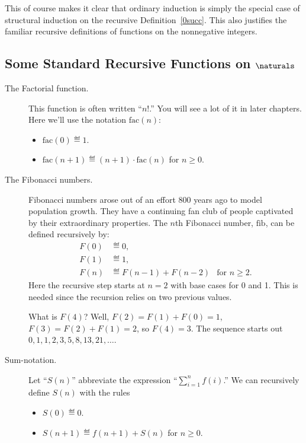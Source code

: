 This of course makes it clear that ordinary induction is simply the
special case of structural induction on the recursive
Definition~\ref{0succ}.  This also justifies the familiar recursive
definitions of functions on the nonnegative integers.

\subsection{Some Standard Recursive Functions on  $\naturals$}

\begin{description}
\item[The Factorial function.] This function is often written ``$n!$.''
  You will see a lot of it in later chapters.  Here we'll use the notation
  $\text{fac}(n)$:
\begin{itemize}
\item $\text{fac}(0) \eqdef 1$.
\item $\text{fac}(n+1) \eqdef (n+1)\cdot \text{fac}(n)$ for $n \ge 0$.
\end{itemize}

\item[The Fibonacci numbers.]  Fibonacci numbers arose out of an effort 800
  years ago to model population growth.  They have a continuing fan club of
  people captivated by their extraordinary properties.  The $n$th Fibonacci
  number, $\text{fib}$, can be defined recursively by:
\begin{align*}
F(0) &\eqdef 0,\\
F(1) &\eqdef 1,\\ 
F(n) &\eqdef F(n-1) + F(n-2) &\mbox{for $n \geq 2$.} 
\end{align*}
Here the recursive step starts at $n=2$ with base cases for 0 and 1.  This
is needed since the recursion relies on two previous values.

What is $F(4)$?  Well, $F(2) = F(1)+F(0) = 1$, $F(3) =
F(2)+F(1) = 2$, so $F(4) = 3$.  The sequence
starts out $0, 1, 1, 2, 3, 5, 8, 13, 21,\dots$.


\item[Sum-notation.]  Let ``$S(n)$'' abbreviate the expression
``$\sum_{i=1}^n f(i)$.''  We can recursively define $S(n)$ with the rules
  \begin{itemize}
  \item $S(0) \eqdef 0$.
  \item $S(n+1) \eqdef  f(n+1) + S(n)$ for $n\geq 0$.
  \end{itemize}


\end{description}
